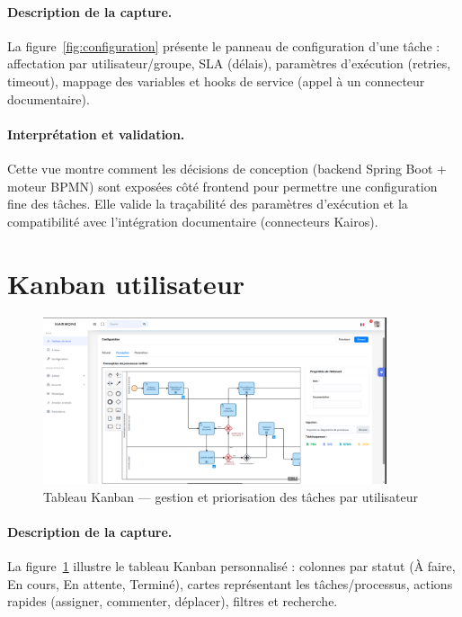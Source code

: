 \paragraph{Description de la capture.}  
La figure~\ref{fig:configuration} présente le panneau de configuration d’une tâche : affectation par utilisateur/groupe, SLA (délais), paramètres d’exécution (retries, timeout), mappage des variables et hooks de service (appel à un connecteur documentaire).

\paragraph{Interprétation et validation.}  
Cette vue montre comment les décisions de conception (backend Spring Boot + moteur BPMN) sont exposées côté frontend pour permettre une configuration fine des tâches. Elle valide la traçabilité des paramètres d’exécution et la compatibilité avec l’intégration documentaire (connecteurs Kairos).

\section{Kanban utilisateur}

\begin{figure}[H]
    \centering
    \includegraphics[width=0.9\textwidth]{Images/configuration.png}
    \caption{Tableau Kanban — gestion et priorisation des tâches par utilisateur}
    \label{fig:kanban}
\end{figure}

\paragraph{Description de la capture.}  
La figure~\ref{fig:kanban} illustre le tableau Kanban personnalisé : colonnes par statut (À faire, En cours, En attente, Terminé), cartes représentant les tâches/processus, actions rapides (assigner, commenter, déplacer), filtres et recherche.

